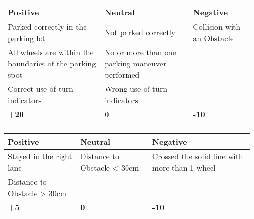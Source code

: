{	\subsubsection*{}
	\begin{table}[H]
		\begin{tabularx}{\textwidth}{XXX}
			\toprule
			\textbf{Positive}                                               & \textbf{Neutral}                               & \textbf{Negative}          \\
			\midrule
			Parked correctly in the parking lot                             & Not parked correctly                           & Collision with an Obstacle \\
			All wheels are within the boundaries of the parking spot & No or more than one parking maneuver performed &                            \\
			Correct use of turn indicators                                  & Wrong use of turn indicators                   &                            \\
			\topstrut
			\textbf{+20}                                                    & \textbf{0}                                     & \textbf{-10}               \\
			\bottomrule
		\end{tabularx}
	\end{table}

	\subsubsection*{}
	\begin{table}[H]
		\begin{tabularx}{\textwidth}{XXX}
			\toprule
			\textbf{Positive}           & \textbf{Neutral}            & \textbf{Negative}                             \\
			\midrule
			Stayed in the right lane    & Distance to Obstacle < 30cm & Crossed the solid line with more than 1 wheel \\
			Distance to Obstacle > 30cm &                             &                                               \\
			\topstrut
			\textbf{+5}                 & \textbf{0}                  & \textbf{-10}                                  \\
			\bottomrule
		\end{tabularx}
	\end{table}

}
